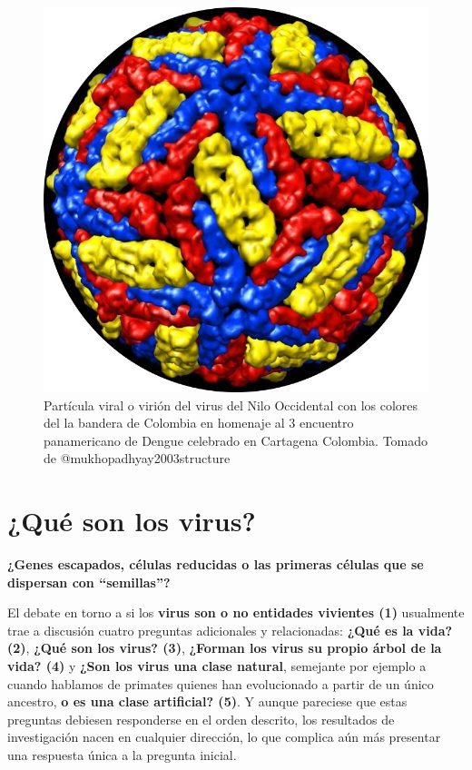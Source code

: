 \documentclass[
  12pt, krantz2,
  spanish,
]{krantz}
\begin{document}
\begin{figure}
\includegraphics[width=0.5\linewidth]{Logo} \caption{Partícula viral o virión del virus del Nilo Occidental con los colores del la bandera de Colombia en homenaje al 3 encuentro panamericano de Dengue celebrado en Cartagena Colombia. Tomado de @mukhopadhyay2003structure}\label{fig:index2}
\end{figure}

\hypertarget{WhatVirusAre}{%
\section{¿Qué son los virus?}\label{WhatVirusAre}}

\textbf{¿Genes escapados, células reducidas o las primeras células que se dispersan con ``semillas''? }

El debate en torno a si los \textbf{virus son o no entidades vivientes (1)} usualmente trae a discusión cuatro preguntas adicionales y relacionadas: \textbf{¿Qué es la vida? (2)}, \textbf{¿Qué son los virus? (3)}, \textbf{¿Forman los virus su propio árbol de la vida? (4)} y \textbf{¿Son los virus una clase natural}, semejante por ejemplo a cuando hablamos de primates quienes han evolucionado a partir de un único ancestro, \textbf{o es una clase artificial? (5)}. Y aunque pareciese que estas preguntas debiesen responderse en el orden descrito, los resultados de investigación nacen en cualquier dirección, lo que complica aún más presentar una respuesta única a la pregunta inicial.
\end{document}
